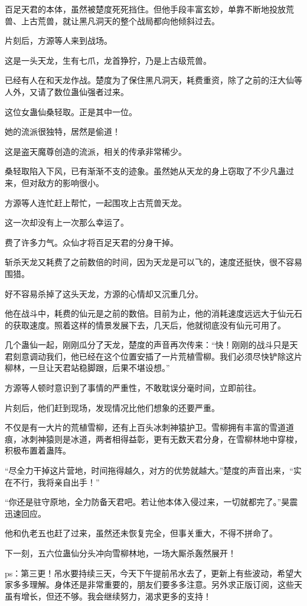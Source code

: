 \begin{this_body}
百足天君的本体，虽然被楚度死死挡住。但他手段丰富玄妙，单靠不断地投放荒兽、上古荒兽，就让黑凡洞天的整个战局都向他倾斜过去。

片刻后，方源等人来到战场。

这是一头天龙，生有七爪，龙首狰狞，乃是上古级荒兽。

已经有人在和天龙作战。楚度为了保住黑凡洞天，耗费重资，除了之前的汪大仙等人外，又请了数位蛊仙强者过来。

这位女蛊仙桑轻取。正是其中一位。

她的流派很独特，居然是偷道！

这是盗天魔尊创造的流派，相关的传承非常稀少。

桑轻取陷入下风，已有渐渐不支的迹象。虽然她从天龙的身上窃取了不少凡蛊过来，但对敌方的影响很小。

方源等人连忙赶上帮忙，一起围攻上古荒兽天龙。

这一次却没有上一次那么幸运了。

费了许多力气。众仙才将百足天君的分身干掉。

斩杀天龙又耗费了之前数倍的时间，因为天龙是可以飞的，速度还挺快，很不容易围猎。

好不容易杀掉了这头天龙，方源的心情却又沉重几分。

他在战斗中，耗费的仙元是之前的数倍。目前为止，他的消耗速度远远大于仙元石的获取速度。照着这样的情景发展下去，几天后，他就彻底没有仙元可用了。

几个蛊仙一起，刚刚瓜分了天龙，楚度的声音再次传来：“快！刚刚的战斗只是天君刻意调动我们，他已经在这个位置安插了一片荒植雪柳。我们必须尽快铲除这片柳林，一旦让天君站稳脚跟，后果不堪设想。”

方源等人顿时意识到了事情的严重性，不敢耽误分毫时间，立即前往。

片刻后，他们赶到现场，发现情况比他们想象的还要严重。

不仅是有一大片的荒植雪柳，还有上百头冰刺神猿护卫。雪柳拥有丰富的雪道道痕，冰刺神猿则是冰道，两者相得益彰，更有无数天君分身，在雪柳林地中穿梭，积极布置着蛊阵。

“尽全力干掉这片营地，时间拖得越久，对方的优势就越大。”楚度的声音出来，“实在不行，我将亲自出手！”

“你还是驻守原地，全力防备天君吧。若让他本体入侵过来，一切就都完了。”昊震迅速回应。

他和仇老五也赶了过来，虽然还未恢复完全，但事关重大，不得不拼命了。

下一刻，五六位蛊仙分头冲向雪柳林地，一场大厮杀轰然展开！

ps：第三更！吊水要持续三天，今天下午提前吊水去了，更新上有些波动，希望大家多多理解。身体还是非常重要的，朋友们要多多注意。另外求正版订阅，这些天虽有增长，但还不够。我会继续努力，渴求更多的支持！

\end{this_body}

